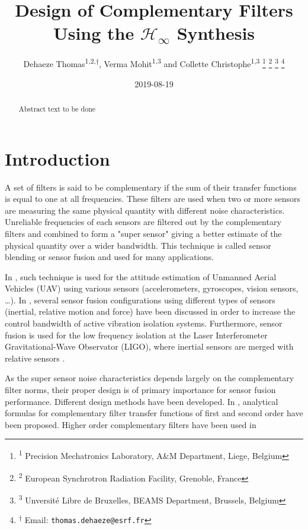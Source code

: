 \documentclass[letterpaper, 10 pt, conference]{ieeeconf}
\author{Dehaeze Thomas\textsuperscript{1,2,$\dagger$}, Verma Mohit\textsuperscript{1,3} and Collette Christophe\textsuperscript{1,3}  \thanks{\textsuperscript{1} Precision Mechatronics Laboratory, A\&M Department, Liege, Belgium} \thanks{\textsuperscript{2} European Synchrotron Radiation Facility, Grenoble, France} \thanks{\textsuperscript{3} Unversité Libre de Bruxelles, BEAMS Department, Brussels, Belgium} \thanks{\textsuperscript{$\dagger$} Email: {\tt\small thomas.dehaeze@esrf.fr}}}
\date{2019-08-19}
\title{Design of Complementary Filters Using the \(\mathcal{H}_\infty\) Synthesis}
\begin{document}
\maketitle


\begin{abstract}
Abstract text to be done
\end{abstract}

\section{Introduction}
\label{sec:org1868519}
\label{sec:introduction}
A set of filters is said to be complementary if the sum of their transfer functions is equal to one at all frequencies.
These filters are used when two or more sensors are measuring the same physical quantity with different noise characteristics. Unreliable frequencies of each sensors are filtered out by the complementary filters and combined to form a "super sensor" giving a better estimate of the physical quantity over a wider bandwidth.
This technique is called sensor blending or sensor fusion and used for many applications.\par
In \cite{zimmermann92_high_bandw_orien_measur_contr,corke04_inert_visual_sensin_system_small_auton_helic,min15_compl_filter_desig_angle_estim}, such technique is used for the attitude estimation of Unmanned Aerial Vehicles (UAV) using various sensors (accelerometers, gyroscopes, vision sensors, \ldots{}).
In \cite{collette15_sensor_fusion_method_high_perfor}, several sensor fusion configurations using different types of sensors (inertial, relative motion and force) have been discussed in order to increase the control bandwidth of active vibration isolation systems.
Furthermore, sensor fusion is used for the low frequency isolation at the Laser Interferometer Gravitational-Wave Observator (LIGO), where inertial sensors are merged with relative sensors
\cite{matichard15_seism_isolat_advan_ligo,hua04_polyp_fir_compl_filter_contr_system}. \par
As the super sensor noise characteristics depends largely on the complementary filter norms, their proper design is of primary importance for sensor fusion performance.
Different design methods have been developed.
In \cite{corke04_inert_visual_sensin_system_small_auton_helic,jensen13_basic_uas,min15_compl_filter_desig_angle_estim}, analytical formulas for complementary filter transfer functions of first and second order have been proposed.
Higher order complementary filters have been used in
\end{document}
